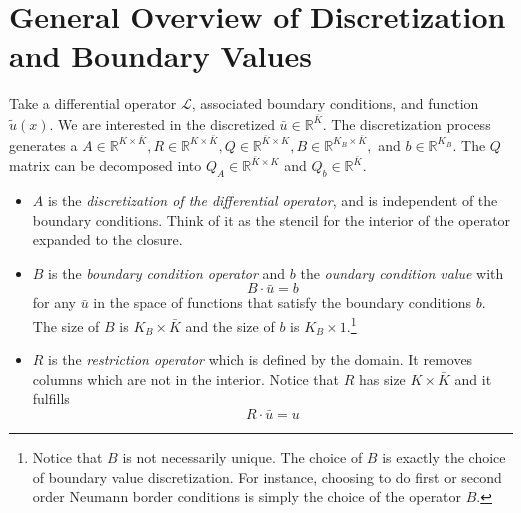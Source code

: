 \documentclass[11pt]{article}
\newcommand{\R}{\ensuremath{\mathbb{R}}}
\begin{document}
	\section{General Overview of Discretization and Boundary Values}\label{sec:general}
	Take a differential operator $\mathcal{L}$, associated boundary conditions, and function $\tilde{u}(x)$.  We are interested in the discretized $\bar{u}\in \R^{\bar{K}}$.  The discretization process generates a $A \in \R^{K\times\bar{K}}, R \in \R^{K\times \bar{K}}, Q \in \R^{\bar{K}\times K}, B \in \R^{K_B \times \bar{K}},$ and $b \in \R^{K_B}$.  The $Q$ matrix can be decomposed into $Q_A \in \R^{\bar{K}\times K}$ and $Q_b \in \R^{\bar{K}}$.
	\begin{itemize}
		\item $A$ is the \textit{discretization of the differential operator}, and is independent of the boundary conditions.  Think of it as the stencil for the interior of the operator expanded to the closure.
		\item $B$ is the \textit{boundary condition operator} and $b$ the \textit{oundary condition value} with
		\begin{equation}
		B\cdot \bar{u} = b
		\label{B_operator_block}
		\end{equation}
		for any $\bar{u}$ in the space of functions that satisfy the boundary conditions $b$. The size of $B$ is $K_{B} \times \bar{K}$ and the size of $b$ is $K_{B} \times 1$.\footnote{
Notice that $B$ is not necessarily unique. The choice of $B$ is exactly the choice of boundary value discretization. For instance, choosing to do first or second order Neumann border conditions is simply the choice of the operator $B$.}
		\item $R$ is the \textit{restriction operator} which is defined by the domain. It removes columns which are not in the interior. Notice that $R$ has size $K \times \bar{K}$ and it fulfills
		\begin{equation}
		R\cdot \bar{u} = u \label{R_operator}
		\end{equation}


\end{itemize}
\end{document}
